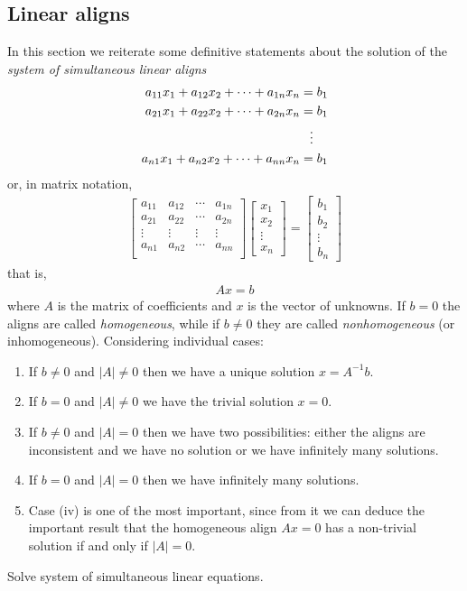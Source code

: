 \documentclass[12pt,a4paper,fleqn]{mycalc}
\begin{document}
	\subsection{Linear aligns}
	In this section we reiterate some definitive statements about the solution of the \emph{system of simultaneous linear aligns}
	\begin{align*}
	a_{11}x_1+a_{12}x_2+\cdots+a_{1n}x_n &=b_1\\
	a_{21}x_1+a_{22}x_2+\cdots+a_{2n}x_n &=b_1\\
	&\hphantom{=} \vdots\\
	a_{n1}x_1+a_{n2}x_2+\cdots+a_{nn}x_n &=b_1
	\end{align*}
	or, in matrix notation,
	\begin{align*}
	\begin{bmatrix}
	a_{11} & a_{12} & \cdots & a_{1n}\\
	a_{21} & a_{22} & \cdots & a_{2n}\\
	\vdots & \vdots & \vdots & \vdots\\
	a_{n1} & a_{n2} & \cdots & a_{nn}\\
	\end{bmatrix}
	\begin{bmatrix}
	x_1\\
	x_2\\
	\vdots\\
	x_n
	\end{bmatrix}
	=
	\begin{bmatrix}
	b_1\\
	b_2\\
	\vdots\\
	b_n
	\end{bmatrix}
	\end{align*}
	that is,
	\begin{align*}
	Ax=b
	\end{align*}
	where \( A \) is the matrix of coefficients and \( x \) is the vector of unknowns. If \( b = 0 \) the aligns are called \emph{homogeneous}, while if \( b \neq 0 \) they are called \emph{nonhomogeneous} (or
	inhomogeneous). Considering individual cases:
	\begin{enumerate}[label={\protect\color{mycalc}Case~(\roman*)}]
		\item If \( b \neq 0 \) and \( |A | \neq 0 \) then we have a unique solution \( x = A^{-1}b. \)
		\item If \( b = 0 \) and \( |A | \neq 0 \) we have the trivial solution \( x = 0. \)
		\item If \( b \neq 0 \) and \( |A | = 0 \) then we have two possibilities: either the aligns are inconsistent
		and we have no solution or we have infinitely many solutions.
		\item If \( b = 0 \) and \( |A | = 0 \) then we have infinitely many solutions.
		\item[] Case (iv) is one of the most important, since from it we can deduce the important result that the homogeneous align \( Ax = 0 \) has a non-trivial solution if and only if \( |A | = 0. \)
	\end{enumerate}
	\begin{tcolorbox}[title={Matlab Practice}]
		Solve system of simultaneous linear equations.
	\end{tcolorbox}
\end{document}
